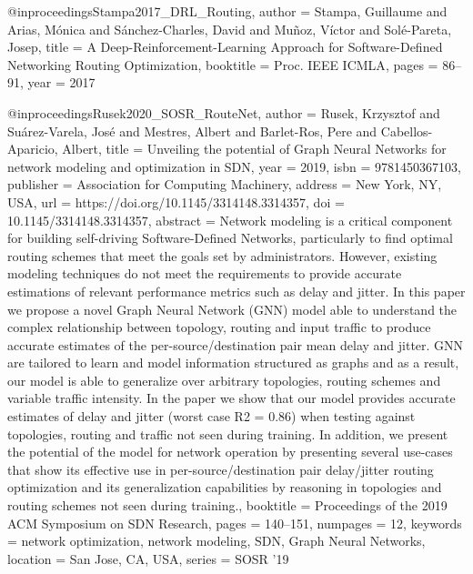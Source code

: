 @inproceedings{Stampa2017_DRL_Routing,
    author    = {Stampa, Guillaume and Arias, M{\'o}nica and S{\'a}nchez-Charles, David and Mu{\~n}oz, V{\'i}ctor and Sol{\'e}-Pareta, Josep},
    title     = {A Deep-Reinforcement-Learning Approach for Software-Defined Networking Routing Optimization},
    booktitle = {Proc. IEEE ICMLA},
    pages     = {86--91},
    year      = {2017}
}

@inproceedings{Rusek2020_SOSR_RouteNet,
author = {Rusek, Krzysztof and Su\'{a}rez-Varela, Jos\'{e} and Mestres, Albert and Barlet-Ros, Pere and Cabellos-Aparicio, Albert},
title = {{Unveiling the potential of Graph Neural Networks for network modeling and optimization in SDN}},
year = {2019},
isbn = {9781450367103},
publisher = {Association for Computing Machinery},
address = {New York, NY, USA},
url = {https://doi.org/10.1145/3314148.3314357},
doi = {10.1145/3314148.3314357},
abstract = {Network modeling is a critical component for building self-driving Software-Defined Networks, particularly to find optimal routing schemes that meet the goals set by administrators. However, existing modeling techniques do not meet the requirements to provide accurate estimations of relevant performance metrics such as delay and jitter. In this paper we propose a novel Graph Neural Network (GNN) model able to understand the complex relationship between topology, routing and input traffic to produce accurate estimates of the per-source/destination pair mean delay and jitter. GNN are tailored to learn and model information structured as graphs and as a result, our model is able to generalize over arbitrary topologies, routing schemes and variable traffic intensity. In the paper we show that our model provides accurate estimates of delay and jitter (worst case R2 = 0.86) when testing against topologies, routing and traffic not seen during training. In addition, we present the potential of the model for network operation by presenting several use-cases that show its effective use in per-source/destination pair delay/jitter routing optimization and its generalization capabilities by reasoning in topologies and routing schemes not seen during training.},
booktitle = {Proceedings of the 2019 ACM Symposium on SDN Research},
pages = {140–151},
numpages = {12},
keywords = {network optimization, network modeling, SDN, Graph Neural Networks},
location = {San Jose, CA, USA},
series = {SOSR '19}
}



